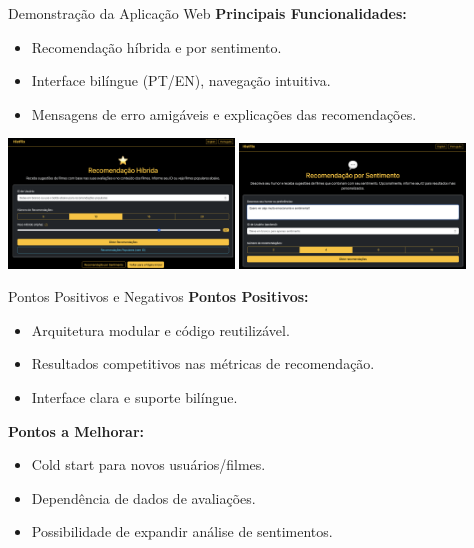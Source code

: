 \documentclass{beamer}
\begin{document}
\begin{frame}{Demonstração da Aplicação Web}
    \textbf{Principais Funcionalidades:}
    \begin{itemize}
        \item Recomendação híbrida e por sentimento.
        \item Interface bilíngue (PT/EN), navegação intuitiva.
        \item Mensagens de erro amigáveis e explicações das recomendações.
    \end{itemize}
    \vspace{0.3cm}
    \includegraphics[width=0.45\textwidth]{../pictures/hybrid_recommendation.png}
    \includegraphics[width=0.45\textwidth]{../pictures/sentiment_recommendation.png}
\end{frame}

\begin{frame}{Pontos Positivos e Negativos}
    \textbf{Pontos Positivos:}
    \begin{itemize}
        \item Arquitetura modular e código reutilizável.
        \item Resultados competitivos nas métricas de recomendação.
        \item Interface clara e suporte bilíngue.
    \end{itemize}
    \vspace{0.3cm}
    \textbf{Pontos a Melhorar:}
    \begin{itemize}
        \item Cold start para novos usuários/filmes.
        \item Dependência de dados de avaliações.
        \item Possibilidade de expandir análise de sentimentos.
    \end{itemize}
\end{frame}
\end{document}
